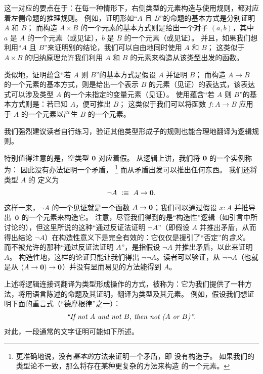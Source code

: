 这一对应的要点在于：在每一种情形下，右侧类型的元素构造与使用规则，都对应着左侧命题的推理规则。
例如，证明形如``$A$ 且 $B$''的命题的基本方式是分别证明 $A$ 和 $B$；
而构造 $A\times B$ 的一个元素的基本方式则是给出一个对子 $(a,b)$，其中 $a$ 是 $A$ 的一个元素（或见证），$b$ 是 $B$ 的一个元素（或见证）。
并且，如果我们想利用``$A$ 且 $B$''来证明别的结论，我们可以自由地同时使用 $A$ 和 $B$；
这类似于 $A\times B$ 的归纳原理允许我们利用 $A$ 和 $B$ 的元素来构造从该类型出发的函数。

类似地，证明蕴含``若 $A$ 则 $B$''的基本方式是假设 $A$ 并证明 $B$；
而构造 $A\to B$ 的一个元素的基本方式，则是给出一个表示 $B$ 的元素（见证）的表达式，该表达式可以涉及类型 $A$ 的一个未指定的变量元素（见证）。
使用蕴含``若 $A$ 则 $B$''的基本方式则是：若已知 $A$，便可推出 $B$；
这类似于我们可以将函数 $f:A\to B$ 应用于 $A$ 的一个元素以产生 $B$ 的一个元素。

我们强烈建议读者自行练习，验证其他类型形成子的规则也能合理地翻译为逻辑规则。

特别值得注意的是，空类型 $\mathbf{0}$ 对应着假。
从逻辑上讲，我们将 $\mathbf{0}$ 的一个实例称为：
%
因此没有办法证明一个矛盾，%
\footnote{更准确地说，没有\emph{基本的}方法来证明一个矛盾，即 \emptyt 没有构造子。
如果我们的类型论不一致，那么将存在某种更复杂的方法来构造 \emptyt 的一个元素。}
而从矛盾出发可以推出任何东西。
我们还将类型 $A$ 的
%
定义为
%
\begin{equation*}
  \neg A \ \vcentcolon\equiv\ A \to \mathbf{0}.
\end{equation*}
%
这样一来，$\neg A$ 的一个见证就是一个函数 $A \to \mathbf{0}$；我们可以通过假设 $x : A$ 并推导出~$\mathbf{0}$ 的一个元素来构造它。
%
注意，尽管我们得到的是``构造性''逻辑（如引言中所讨论的），但这里所说的这种``通过反证法证明 $\neg A$''（即假设 $A$ 并推出矛盾，从而得出结论 $\neg A$）在构造性意义下是完全有效的：它仅仅是援引了``否定''的\emph{含义}。
而不被允许的那种``通过反证法证明 $A$''，是指假设 $\neg A$ 并推出矛盾，以此来证明 $A$。
构造性地，这样的论证只能让我们得出 $\neg\neg A$。读者可以验证，从 $\neg\neg A$（也就是从 $(A\to \mathbf{0})\to\mathbf{0}$）并没有显而易见的方法能得到 $A$。

\mentalpause

上述将逻辑连接词翻译为类型形成操作的方式，被称为：它为我们提供了一种方法，将用语言陈述的命题及其证明，翻译为类型及其元素。
例如，假设我们想证明下面的重言式（``德摩根律''之一）：
%
%
\begin{equation}\label{eq:tautology1}
  \text{\emph{``If not $A$ and not $B$, then not ($A$ or $B$)''}.}
\end{equation}
对此，一段通常的文字证明可能如下所述。

